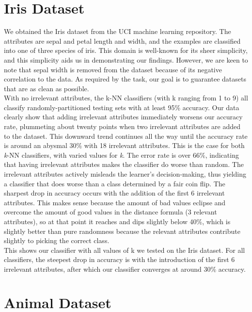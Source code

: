 \documentclass{article}
\begin{document}
\section{Iris Dataset}

We obtained the Iris dataset from the UCI machine learning repository. The attributes are sepal and petal length and width, and the examples are classified into one of three species of iris. This domain is well-known for its sheer simplicity, and this simplicity aids us in demonstrating our findings. However, we are keen to note that sepal width is removed from the dataset because of its negative correlation to the data. As required by the task, our goal is to guarantee datasets that are as clean as possible. \\ 

With no irrelevant attributes, the k-NN classifiers (with k ranging from 1 to 9) all classify randomly-partitioned testing sets with at least 95\% accuracy. Our data clearly show that adding irrelevant attributes immediately worsens our accuracy rate, plummeting about twenty points when two irrelevant attributes are added to the dataset. This downward trend continues all the way until the accuracy rate is around an abysmal 30\% with 18 irrelevant attributes. This is the case for both\textit{ k}-NN classifiers, with varied values for \textit{k}. The error rate is over 66\%, indicating that having irrelevant attributes makes the classifier do worse than random. The irrelevant attributes actively misleads the learner's decision-making, thus yielding a classifier that does worse than a class determined by a fair coin flip. The sharpest drop in accuracy occurs with the addition of the first 6 irrelevant attributes. This makes sense because the amount of bad values eclipse and overcome the amount of good values in the distance formula (3 relevant attributes), so at that point it reaches and dips slightly below 40\%, which is slightly better than pure randomness because the relevant attributes contribute slightly to picking the correct class. \\

This shows our classifier with all values of k we tested on the Iris dataset. For all classifiers, the steepest drop in accuracy is with the introduction of the first 6 irrelevant attributes, after which our classifier converges at around 30\% accuracy. \\


\section{Animal Dataset}
\end{document}

